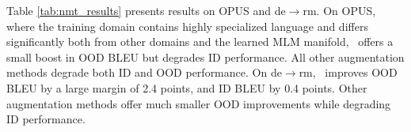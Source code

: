 Table \ref{tab:nmt_results} presents results on OPUS and de$\to$rm.
On OPUS, where the training domain contains highly specialized language and differs significantly both from other domains and the learned MLM manifold, 
\ssmba\ offers a small boost in OOD BLEU but degrades ID performance. 
All other augmentation methods degrade both ID and OOD performance.
On de$\to$rm, \ssmba\ improves OOD BLEU by a large margin of 2.4 points, and ID BLEU by 0.4 points. 
Other augmentation methods offer much smaller OOD improvements while degrading ID performance.